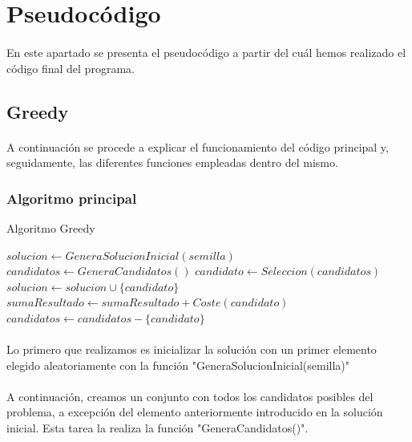 \documentclass{article}
\begin{document}
	\section{Pseudocódigo}
	
	\paragraph{}En este apartado se presenta el pseudocódigo a partir del cuál hemos realizado el código final del programa.
	
	\subsection{Greedy}
	
		\paragraph{}A continuación se procede a explicar el funcionamiento del código principal y, seguidamente, las diferentes funciones empleadas dentro del mismo.
	
	\subsubsection{Algoritmo principal}
		\begin{algorithm}[H]
			\caption{Algoritmo Greedy}
			\begin{algorithmic}
				\STATE $solucion \leftarrow GeneraSolucionInicial(semilla)$
				\STATE $candidatos \leftarrow GeneraCandidatos()$
				\STATE $candidato \leftarrow Seleccion(candidatos)$
				\STATE $solucion \leftarrow solucion \cup \{candidato\}$
				\STATE $sumaResultado \leftarrow sumaResultado + Coste(candidato)$
				\ENDIF
				\STATE $candidatos \leftarrow candidatos - \{ candidato \}$
				\ENDWHILE
			\end{algorithmic}
		\end{algorithm}
	
		\paragraph{}Lo primero que realizamos es inicializar la solución con un primer elemento elegido aleatoriamente con la función "GeneraSolucionInicial(semilla)"
		
		\paragraph{}A continuación, creamos un conjunto con todos los candidatos posibles del problema, a excepción del elemento anteriormente introducido en la solución inicial. Esta tarea la realiza la función "GeneraCandidatos()".
		
\end{document}
